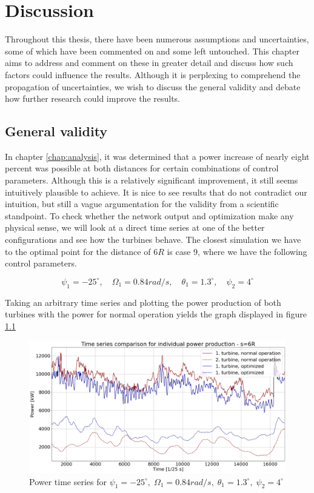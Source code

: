 \chapter{Discussion}
Throughout this thesis, there have been numerous assumptions and uncertainties, some of which have been commented on and some left untouched. This chapter aims to address and comment on these in greater detail and discuss how such factors could influence the results. Although it is perplexing to comprehend the propagation of uncertainties, we wish to discuss the general validity and debate how further research could improve the results. 

\section{General validity}
In chapter \ref{chap:analysis}, it was determined that a power increase of nearly eight percent was possible at both distances for certain combinations of control parameters. Although this is a relatively significant improvement, it still seems intuitively plausible to achieve. It is nice to see results that do not contradict our intuition, but still a vague argumentation for the validity from a scientific standpoint. To check whether the network output and optimization make any physical sense, we will look at a direct time series at one of the better configurations and see how the turbines behave. The closest simulation we have to the optimal point for the distance of $6R$ is case 9, where we have the following control parameters. 

\begin{equation*}
    \psi_1=-25^\circ, \quad \Omega_1=0.84 rad/s, \quad \theta_1 = 1.3^\circ, \quad \psi_2 = 4^\circ
\end{equation*}

Taking an arbitrary time series and plotting the power production of both turbines with the power for normal operation yields the graph displayed in figure \ref{fig:powertimeseries}

\begin{figure}[H]
    \centering
    \includegraphics[scale=0.26]{Illustrations/Timeseries_y1=-25_o1=85_p1=130_s6R_y2=4.png}
    \caption{Power time series for $\psi_1=-25^\circ, \; \Omega_1=0.84 rad/s, \; \theta_1 = 1.3^\circ, \; \psi_2 = 4^\circ$}
    \label{fig:powertimeseries}
\end{figure}

